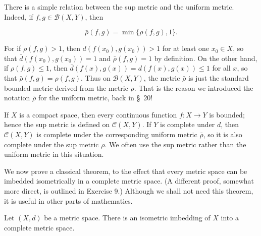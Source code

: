 There is a simple relation between the sup metric and the uniform metric. Indeed, if \(f,g \in \mathcal{B}({X,Y})\), then

\[
\bar{\rho }({f,g}) = \min \{ \rho ({f,g}),1\}.
\]

For if \(\rho ({f,g}) > 1\), then \(d({f(x_{0}),g(x_{0}) }) > 1\) for at least one \(x_{0} \in X\), so that \(\bar{d}({f(x_{0}),g(x_{0}) }) = 1\) and \(\bar{\rho }({f,g}) = 1\) by definition. On the other hand, if \(\rho ({f,g}) \leq 1\), then \(\bar{d}({f(x),g(x) }) = d({f(x),g(x) }) \leq 1\) for all \(x\), so that \(\bar{\rho }({f,g}) = \rho ({f,g})\). Thus on \(\mathcal{B}({X,Y})\), the metric \(\bar{\rho }\) is just the standard bounded metric derived from the metric \(\rho\). That is the reason we introduced the notation \(\bar{\rho }\) for the uniform metric, back in \S\ 20!

If \(X\) is a compact space, then every continuous function \(f : X \rightarrow Y\) is bounded; hence the sup metric is defined on \(\mathcal{C}({X,Y})\). If \(Y\) is complete under \(d\), then \(\mathcal{C}({X,Y})\) is complete under the corresponding uniform metric \(\bar{\rho }\), so it is also complete under the sup metric \(\rho\). We often use the sup metric rather than the uniform metric in this situation.

We now prove a classical theorem, to the effect that every metric space can be imbedded isometrically in a complete metric space. (A different proof, somewhat more direct, is outlined in Exercise 9.) Although we shall not need this theorem, it is useful in other parts of mathematics.

\begin{theorem}
\label{thm:\thetheorem}
Let \((X, d)\) be a metric space. There is an isometric imbedding of \(X\) into a complete metric space.
\end{theorem}

